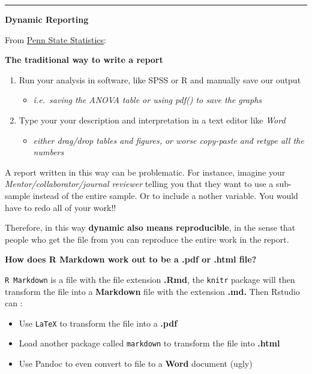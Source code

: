 \documentclass[]{book}
\providecommand{\tightlist}{%
  \setlength{\itemsep}{0pt}\setlength{\parskip}{0pt}}
\theoremstyle{definition}
\theoremstyle{definition}
\theoremstyle{definition}
\theoremstyle{remark}
\begin{document}
\begin{center}\rule{0.5\linewidth}{\linethickness}\end{center}

\textbf{Dynamic Reporting}

From
\href{https://onlinecourses.science.psu.edu/statprogram/markdown}{Penn
State Statistics}:

\textbf{The traditional way to write a report}

\begin{enumerate}
\def\labelenumi{\arabic{enumi}.}
\tightlist
\item
  Run your analysis in software, like SPSS or R and manually save our
  output

  \begin{itemize}
  \tightlist
  \item
    \emph{i.e.~saving the ANOVA table or using pdf() to save the graphs}
  \end{itemize}
\item
  Type your your description and interpretation in a text editor like
  \emph{Word}

  \begin{itemize}
  \tightlist
  \item
    \emph{either drag/drop tables and figures, or worse copy-paste and
    retype all the numbers}
  \end{itemize}
\end{enumerate}

A report written in this way can be problematic. For instance, imagine
your \emph{Mentor/collaborator/journal reviewer} telling you that they
want to use a sub-sample instead of the entire sample. Or to include a
nother variable. You would have to redo all of your work!!

Therefore, in this way \textbf{dynamic also means reproducible}, in the
sense that people who get the file from you can reproduce the entire
work in the report.

\textbf{How does R Markdown work out to be a .pdf or .html file?}

\texttt{R\ Markdown} is a file with the file extension \textbf{.Rmd},
the \texttt{knitr} package will then transform the file into a
\textbf{Markdown} file with the extension \textbf{.md.} Then Rstudio can
\citep{xie2015}:

\begin{itemize}
\item
  Use \texttt{LaTeX} to transform the file into a \textbf{.pdf}
\item
  Load another package called \texttt{markdown} to transform the file
  into \textbf{.html}
\item
  Use Pandoc to even convert to file to a \textbf{Word} document (ugly)
\end{itemize}
\end{document}
